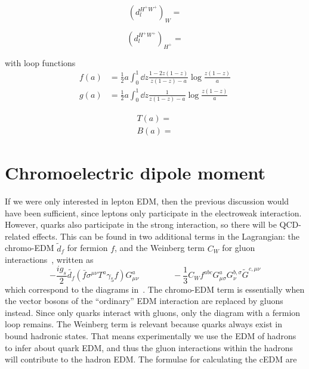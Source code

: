 \begin{equation}\label{eq:BarrZee-cHW-Wloop}
	(d^{H^{+}W^{+}}_{l})_{W} = 
\end{equation}

\begin{equation}\label{eq:BarrZee-cHW-cHloop}
	(d^{H^{+}W^{+}}_{l})_{H^{+}} = 
\end{equation}

with loop functions
\begin{align}
	f(a) &= \frac{1}{2} a \int_{0}^{1}\dd{z}\frac{1-2z(1-z)}{z(1-z)-a}\log{\frac{z(1-z)}{a}} \nonumber \\
	g(a) &= \frac{1}{2} a \int_{0}^{1}\dd{z}\frac{1}{z(1-z)-a}\log{\frac{z(1-z)}{a}}
\end{align}

\begin{align}
	T(a)= \nonumber \\
	B(a)=
\end{align}

\section{Chromoelectric dipole moment}
If we were only interested in lepton EDM, then the previous discussion would have been sufficient, since leptons only participate in the electroweak interaction.
However, quarks also participate in the strong interaction, so there will be QCD-related effects.
This can be found in two additional terms in the Lagrangian: 
the chromo-EDM \(\tilde{d}_{f} \) for fermion \(f \), and the Weinberg term \(C_{W} \) for gluon interactions~\cite{Weinberg1989Gluon}, written as
\begin{equation}
  -\frac{i g_{s}}{2}\tilde{d_{f}}\left(\bar{f}\sigma^{\mu\nu}T^{a}\gamma_{5}f\right)G^{a}_{\mu\nu}\quad \qquad \quad -\frac{1}{3}C_Wf^{abc}G^{a}_{\mu\sigma}G^{b,\sigma}_{\nu}\tilde{G}^{c,\mu\nu}
\end{equation}
which correspond to the diagrams in~.
The chromo-EDM term is essentially when the vector bosons of the ``ordinary'' EDM interaction are replaced by gluons instead.
Since only quarks interact with gluons, only the diagram with a fermion loop remains.
The Weinberg term is relevant because quarks always exist in bound hadronic states.
That means experimentally we use the EDM of hadrons to infer about quark EDM, and thus the gluon interactions within the hadrons will contribute to the hadron EDM.
The formulae for calculating the cEDM are

